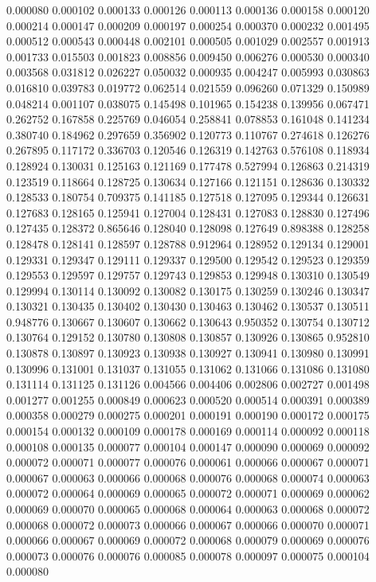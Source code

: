 0.000080
0.000102
0.000133
0.000126
0.000113
0.000136
0.000158
0.000120
0.000214
0.000147
0.000209
0.000197
0.000254
0.000370
0.000232
0.001495
0.000512
0.000543
0.000448
0.002101
0.000505
0.001029
0.002557
0.001913
0.001733
0.015503
0.001823
0.008856
0.009450
0.006276
0.000530
0.000340
0.003568
0.031812
0.026227
0.050032
0.000935
0.004247
0.005993
0.030863
0.016810
0.039783
0.019772
0.062514
0.021559
0.096260
0.071329
0.150989
0.048214
0.001107
0.038075
0.145498
0.101965
0.154238
0.139956
0.067471
0.262752
0.167858
0.225769
0.046054
0.258841
0.078853
0.161048
0.141234
0.380740
0.184962
0.297659
0.356902
0.120773
0.110767
0.274618
0.126276
0.267895
0.117172
0.336703
0.120546
0.126319
0.142763
0.576108
0.118934
0.128924
0.130031
0.125163
0.121169
0.177478
0.527994
0.126863
0.214319
0.123519
0.118664
0.128725
0.130634
0.127166
0.121151
0.128636
0.130332
0.128533
0.180754
0.709375
0.141185
0.127518
0.127095
0.129344
0.126631
0.127683
0.128165
0.125941
0.127004
0.128431
0.127083
0.128830
0.127496
0.127435
0.128372
0.865646
0.128040
0.128098
0.127649
0.898388
0.128258
0.128478
0.128141
0.128597
0.128788
0.912964
0.128952
0.129134
0.129001
0.129331
0.129347
0.129111
0.129337
0.129500
0.129542
0.129523
0.129359
0.129553
0.129597
0.129757
0.129743
0.129853
0.129948
0.130310
0.130549
0.129994
0.130114
0.130092
0.130082
0.130175
0.130259
0.130246
0.130347
0.130321
0.130435
0.130402
0.130430
0.130463
0.130462
0.130537
0.130511
0.948776
0.130667
0.130607
0.130662
0.130643
0.950352
0.130754
0.130712
0.130764
0.129152
0.130780
0.130808
0.130857
0.130926
0.130865
0.952810
0.130878
0.130897
0.130923
0.130938
0.130927
0.130941
0.130980
0.130991
0.130996
0.131001
0.131037
0.131055
0.131062
0.131066
0.131086
0.131080
0.131114
0.131125
0.131126
0.004566
0.004406
0.002806
0.002727
0.001498
0.001277
0.001255
0.000849
0.000623
0.000520
0.000514
0.000391
0.000389
0.000358
0.000279
0.000275
0.000201
0.000191
0.000190
0.000172
0.000175
0.000154
0.000132
0.000109
0.000178
0.000169
0.000114
0.000092
0.000118
0.000108
0.000135
0.000077
0.000104
0.000147
0.000090
0.000069
0.000092
0.000072
0.000071
0.000077
0.000076
0.000061
0.000066
0.000067
0.000071
0.000067
0.000063
0.000066
0.000068
0.000076
0.000068
0.000074
0.000063
0.000072
0.000064
0.000069
0.000065
0.000072
0.000071
0.000069
0.000062
0.000069
0.000070
0.000065
0.000068
0.000064
0.000063
0.000068
0.000072
0.000068
0.000072
0.000073
0.000066
0.000067
0.000066
0.000070
0.000071
0.000066
0.000067
0.000069
0.000072
0.000068
0.000079
0.000069
0.000076
0.000073
0.000076
0.000076
0.000085
0.000078
0.000097
0.000075
0.000104
0.000080
